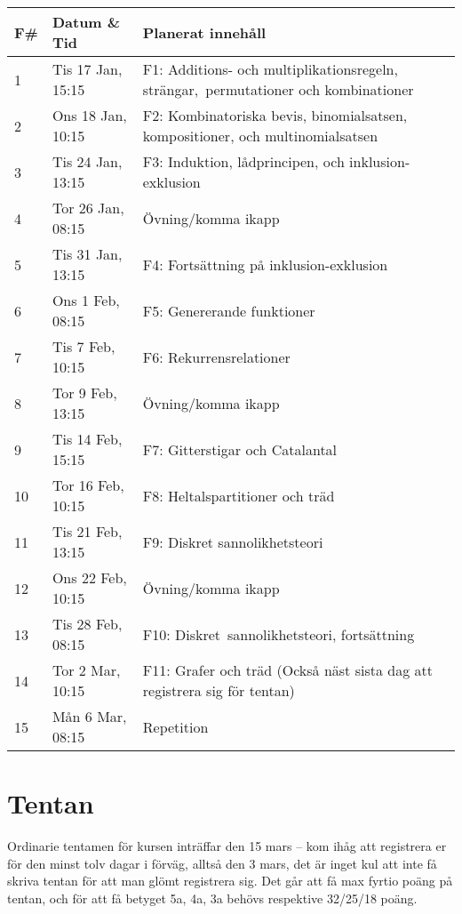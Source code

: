 \documentclass{tufte-handout}
\begin{document}
\begin{table}[h]
\begin{tabularx}{\textwidth}{llX}
F\# & Datum \& Tid      & Planerat innehåll \\ 
\midrule
1            & Tis 17 Jan, 15:15 & F1: Additions- och multiplikationsregeln, strängar,\, permutationer och kombinationer\\
2            & Ons 18 Jan, 10:15 & F2: Kombinatoriska bevis, binomialsatsen, kompositioner, och multinomialsatsen\\
3            & Tis 24 Jan, 13:15 & F3: Induktion, lådprincipen, och inklusion-exklusion\\
4            & Tor 26 Jan, 08:15 & Övning/komma ikapp\\
5	      & Tis 31 Jan, 13:15 & F4: Fortsättning på inklusion-exklusion\\
6            & Ons 1 Feb, 08:15 & F5: Genererande funktioner\\
7            & Tis 7 Feb, 10:15  & F6: Rekurrensrelationer\\
8            & Tor 9 Feb, 13:15  & Övning/komma ikapp\\
9            & Tis 14 Feb, 15:15 & F7: Gitterstigar och Catalantal\\
10            & Tor 16 Feb, 10:15 & F8: Heltalspartitioner och träd\\
11            & Tis 21 Feb, 13:15 & F9: Diskret sannolikhetsteori\\
12           & Ons 22 Feb, 10:15 & Övning/komma ikapp\\
13           & Tis 28 Feb, 08:15 & F10: Diskret\, sannolikhetsteori, fortsättning\\
14           & Tor 2 Mar, 10:15  & F11: Grafer och träd (Också näst sista dag att registrera sig för tentan)\\
15           & Mån 6 Mar, 08:15 & Repetition
\end{tabularx}
\end{table}

\section{Tentan}

Ordinarie tentamen för kursen inträffar den 15 mars -- kom ihåg att registrera er för den minst tolv dagar i förväg, alltså den 3 mars, det är inget kul att inte få skriva tentan för att man glömt registrera sig. Det går att få max fyrtio poäng på tentan, och för att få betyget 5a, 4a, 3a behövs respektive 32/25/18 poäng.
\end{document}

